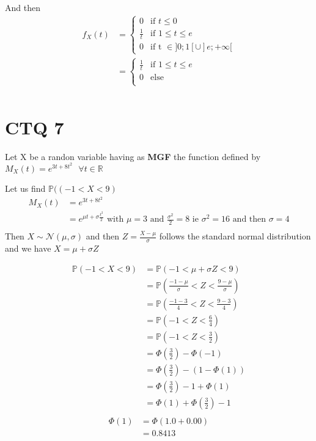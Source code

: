 \documentclass[11pt]{article}
\def\lt{<}
\begin{document}
And then 
\begin{align*}
f_X(t)
&=  \begin{cases}
		   0 & \text{if } t \le 0 \\ 
           \frac{1}{t} & \text{if } 1 \le t \le e \\
           0& \text{if t  } \in ]0;1[\cup]e;+\infty[
        \end{cases}   \\  
        &=  \begin{cases}
        \frac{1}{t} & \text{if } 1 \le t \le e \\
		   0 & \text{else } \\ 
        \end{cases}   \\            
\end{align*}

\newpage  
  \section{CTQ 7} 
  
  Let X be a randon variable having as \textbf{MGF} the function defined by $M_X(t)=e^{3t+8t^2} \text{ } \forall t \in \mathbb{R}$
 
 Let us find $\mathbb {P}((-1\lt X\lt 9)$
 \begin{align*}
M_X(t)&=e^{3t+8t^2}\\  
&=e^{\mu t+\sigma \frac{t^2}{2} } \text{ with } \mu=3 \text{ and }  \frac{\sigma^2}{2} =8 \text{ ie } \sigma^2=16 \text{ and then }  \sigma=4  \\   
\end{align*}
Then  $ X \sim \mathcal N(\mu,\sigma)$ and then $Z=\frac{X-\mu}{\sigma}$ follows the standard normal distribution and we have $X=\mu +\sigma Z$ 

\begin{align*}
\mathbb {P}(-1\lt X\lt 9)
&=\mathbb {P}(-1\lt \mu +\sigma Z \lt 9)\\  
&=\mathbb {P}(\frac{-1-\mu}{\sigma} \lt  Z \lt \frac{9-\mu}{\sigma})\\ 
&=\mathbb {P}(\frac{-1-3}{4} \lt  Z \lt \frac{9-3}{4})\\ 
&=\mathbb {P}(-1 \lt  Z \lt \frac{6}{4})\\ 
&=\mathbb {P}(-1 \lt  Z \lt \frac{3}{2})\\ 
&=\Phi(\frac{3}{2}) - \Phi(-1)\\ 
&=\Phi(\frac{3}{2}) - (1-\Phi(1))\\
&=\Phi(\frac{3}{2}) - 1+\Phi(1)\\ 
&=\Phi(1)+\Phi(\frac{3}{2}) - 1\\ 
\end{align*} 
 \begin{align*}
\Phi(1)
&=\Phi(1.0+0.00)\\
&=0.8413   
\end{align*} 
\end{document}
